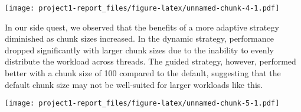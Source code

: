 \documentclass[
]{article}
\begin{document}
\texttt{[image: project1-report\_files/figure-latex/unnamed-chunk-4-1.pdf]}

In our side quest, we observed that the benefits of a more adaptive
strategy diminished as chunk sizes increased. In the dynamic strategy,
performance dropped significantly with larger chunk sizes due to the
inability to evenly distribute the workload across threads. The guided
strategy, however, performed better with a chunk size of 100 compared to
the default, suggesting that the default chunk size may not be
well-suited for larger workloads like this.

\texttt{[image: project1-report\_files/figure-latex/unnamed-chunk-5-1.pdf]}
\end{document}
